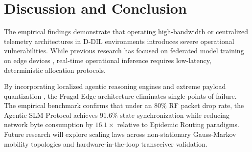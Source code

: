 \section{Discussion and Conclusion}

The empirical findings demonstrate that operating high-bandwidth or centralized telemetry architectures in D-DIL environments introduces severe operational vulnerabilities. While previous research has focused on federated model training on edge devices \cite{imteaj2022}, real-time operational inference requires low-latency, deterministic allocation protocols.

By incorporating localized agentic reasoning engines and extreme payload quantization \cite{steinberger2026}, the Frugal Edge architecture eliminates single points of failure. The empirical benchmark confirms that under an $80\%$ RF packet drop rate, the Agentic SLM Protocol achieves $91.6\%$ state synchronization while reducing network byte consumption by $16.1\times$ relative to Epidemic Routing paradigms. Future research will explore scaling laws across non-stationary Gauss-Markov mobility topologies and hardware-in-the-loop transceiver validation.

